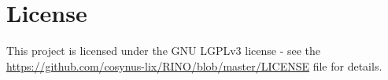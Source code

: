 \documentclass{article}
\begin{document}


\section{License}

This project is licensed under the GNU LGPLv3 license - see the \url{https://github.com/cosynus-lix/RINO/blob/master/LICENSE} file for details.








\end{document}
